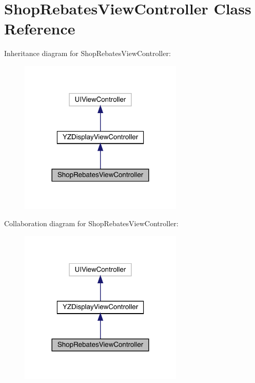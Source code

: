\hypertarget{interface_shop_rebates_view_controller}{}\section{Shop\+Rebates\+View\+Controller Class Reference}
\label{interface_shop_rebates_view_controller}


Inheritance diagram for Shop\+Rebates\+View\+Controller\+:\nopagebreak
\begin{figure}[H]
\begin{center}
\leavevmode
\includegraphics[width=221pt]{interface_shop_rebates_view_controller__inherit__graph}
\end{center}
\end{figure}


Collaboration diagram for Shop\+Rebates\+View\+Controller\+:\nopagebreak
\begin{figure}[H]
\begin{center}
\leavevmode
\includegraphics[width=221pt]{interface_shop_rebates_view_controller__coll__graph}
\end{center}
\end{figure}

